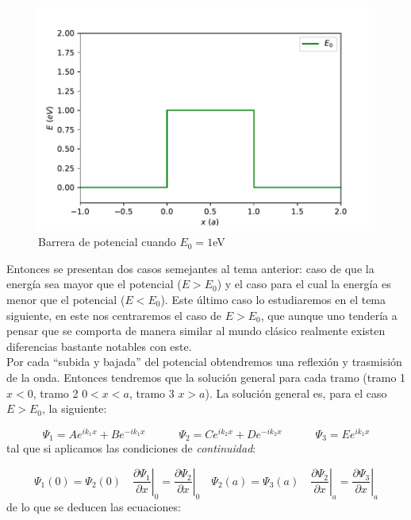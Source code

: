 \documentclass[12pt]{article}
\newcommand{\parciales}[2]{\frac{\partial #1}{\partial #2}}
\newcommand{\tquad}{\quad \quad \quad}
\begin{document}
\begin{figure}[h!] \centering
\includegraphics[scale=0.7]{barrera-potencial.pdf}
\caption{Barrera de potencial cuando $E_0 = 1$eV}
\label{Fig:25.01-Barrera}
\end{figure}
 
Entonces se presentan dos casos semejantes al tema anterior: caso de que la energía sea mayor que el potencial ($E>E_0$) y el caso para el cual la energía es menor que el potencial ($E<E_0$). Este último caso lo estudiaremos en el tema siguiente, en este nos centraremos el caso de $E>E_0$, que aunque uno tendería a pensar que se comporta de manera similar al mundo clásico realmente existen diferencias bastante notables con este. \\

Por cada ``subida y bajada'' del potencial obtendremos una reflexión y trasmisión de la onda. Entonces tendremos que la solución general para cada tramo (tramo 1 $x<0$, tramo 2 $0<x<a$, tramo 3 $x>a$). La solución general es, para el caso $E>E_0$, la siguiente:

\begin{equation}
\Psi_1 = A e^{ik_1x} +  B e^{-ik_1x}  \tquad
\Psi_2 = C e^{ik_2x} +  D e^{-ik_2x}  \tquad
\Psi_3 = E e^{ik_1x} 
\end{equation}
tal que si aplicamos las condiciones de \textit{continuidad}:

\begin{equation}
\Psi_1 (0) = \Psi_2 (0) \quad \left. \parciales{\Psi_1}{x} \right|_0 = \left. \parciales{\Psi_2}{x} \right|_0  \quad 
\Psi_2 (a) = \Psi_3 (a) \quad \left. \parciales{\Psi_2}{x} \right|_a = \left. \parciales{\Psi_3}{x} \right|_a
\end{equation}
de lo que se deducen las ecuaciones:
\end{document}
